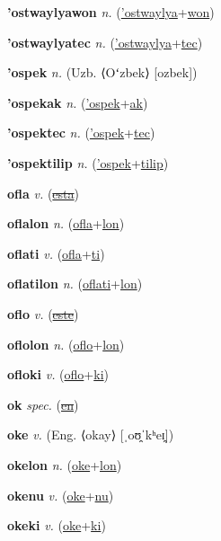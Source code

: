 \textbf{\hypertarget{'ostwaylyawon}{'ostwaylyawon}} \textit{n.} (\hyperlink{'ostwaylya}{'ostwaylya}+\allowbreak \hyperlink{won}{won})


\textbf{\hypertarget{'ostwaylyatec}{'ostwaylyatec}} \textit{n.} (\hyperlink{'ostwaylya}{'ostwaylya}+\allowbreak \hyperlink{tec}{tec})


\textbf{\hypertarget{'ospek}{'ospek}} \textit{n.} (Uzb. ⟨Oʻzbek⟩ [ozbek])


\textbf{\hypertarget{'ospekak}{'ospekak}} \textit{n.} (\hyperlink{'ospek}{'ospek}+\allowbreak \hyperlink{ak}{ak})


\textbf{\hypertarget{'ospektec}{'ospektec}} \textit{n.} (\hyperlink{'ospek}{'ospek}+\allowbreak \hyperlink{tec}{tec})


\textbf{\hypertarget{'ospektilip}{'ospektilip}} \textit{n.} (\hyperlink{'ospek}{'ospek}+\allowbreak \hyperlink{tilip}{tilip})


\textbf{\hypertarget{ofla}{ofla}} \textit{v.} (\hyperlink{esta}{\sout{esta}})


\textbf{\hypertarget{oflalon}{oflalon}} \textit{n.} (\hyperlink{ofla}{ofla}+\allowbreak \hyperlink{lon}{lon})


\textbf{\hypertarget{oflati}{oflati}} \textit{v.} (\hyperlink{ofla}{ofla}+\allowbreak \hyperlink{ti}{ti})


\textbf{\hypertarget{oflatilon}{oflatilon}} \textit{n.} (\hyperlink{oflati}{oflati}+\allowbreak \hyperlink{lon}{lon})


\textbf{\hypertarget{oflo}{oflo}} \textit{v.} (\hyperlink{este}{\sout{este}})


\textbf{\hypertarget{oflolon}{oflolon}} \textit{n.} (\hyperlink{oflo}{oflo}+\allowbreak \hyperlink{lon}{lon})


\textbf{\hypertarget{ofloki}{ofloki}} \textit{v.} (\hyperlink{oflo}{oflo}+\allowbreak \hyperlink{ki}{ki})


\textbf{\hypertarget{ok}{ok}} \textit{spec.} (\hyperlink{en}{\sout{en}})


\textbf{\hypertarget{oke}{oke}} \textit{v.} (Eng. ⟨okay⟩ [ˌoʊ̯ˈkʰeɪ̯])


\textbf{\hypertarget{okelon}{okelon}} \textit{n.} (\hyperlink{oke}{oke}+\allowbreak \hyperlink{lon}{lon})


\textbf{\hypertarget{okenu}{okenu}} \textit{v.} (\hyperlink{oke}{oke}+\allowbreak \hyperlink{nu}{nu})


\textbf{\hypertarget{okeki}{okeki}} \textit{v.} (\hyperlink{oke}{oke}+\allowbreak \hyperlink{ki}{ki})


